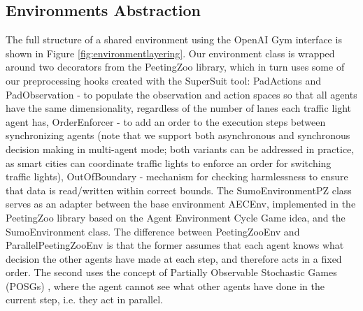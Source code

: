 \documentclass[a4paper,twoside]{article}
\begin{document}
\subsection {Environments Abstraction}
The full structure of a shared environment using the OpenAI Gym \cite{gym} interface is shown in Figure \ref{fig:environmentlayering}. Our environment class is wrapped around two decorators from the PeetingZoo library, which in turn uses some of our preprocessing hooks created with the SuperSuit tool: PadActions and PadObservation - to populate the observation and action spaces so that all agents have the same dimensionality, regardless of the number of lanes each traffic light agent has, OrderEnforcer - to add an order to the execution steps between synchronizing agents (note that we support both asynchronous and synchronous decision making in multi-agent mode; both variants can be addressed in practice, as smart cities can coordinate traffic lights to enforce an order for switching traffic lights), OutOfBoundary - mechanism for checking harmlessness to ensure that data is read/written within correct bounds. The SumoEnvironmentPZ class serves as an adapter between the base environment AECEnv, implemented in the PeetingZoo library based on the Agent Environment Cycle Game \cite{terry2021agent} idea, and the SumoEnvironment class. The difference between PeetingZooEnv and ParallelPeetingZooEnv is that the former assumes that each agent knows what decision the other agents have made at each step, and therefore acts in a fixed order. The second uses the concept of Partially Observable Stochastic Games (POSGs) \cite{DBLP:conf/ijcai/TomasekHABC21}, where the agent cannot see what other agents have done in the current step, i.e. they act in parallel. 
\end{document}
